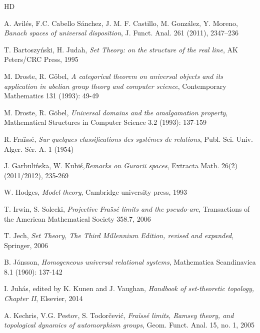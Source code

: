 \documentclass[11pt]{amsart}
\theoremstyle{definition}
\begin{document}
\begin{thebibliography}{HD}
	\baselineskip=15pt
	
	\begin{small}
		

         A. Avil\'es, F.C. Cabello S\'anchez, J. M. F. Castillo, M. Gonz\'alez, Y. Moreno, \textit{Banach spaces of universal disposition}, J. Funct. Anal. 261 (2011), 2347–236
     
	     T. Bartoszy\'nski, H. Judah, \textit{Set Theory: on the structure of the real line}, AK Peters/CRC Press, 1995

         M. Droste, R. G\"obel, \textit{A categorical theorem on universal objects and its application in abelian group theory and computer science}, Contemporary Mathematics 131 (1993): 49-49

         M. Droste, R. G\"obel, \textit{Universal domains and the amalgamation property}, Mathematical Structures in Computer Science 3.2 (1993): 137-159

         R. Fra\"iss\'e, \textit{Sur quelques classifications des syst\'emes de relations}, Publ. Sci. Univ. Alger. S\'er. A. 1 (1954)

         J. Garbuli\'nska, W. Kubi\'s,\textit{Remarks on Gurarii spaces},  Extracta Math. 26(2) (2011/2012), 235-269

         W. Hodges, \textit{Model theory}, Cambridge university press, 1993

         T. Irwin, S. Solecki, \textit{Projective Fra\"ss\'e limits and the pseudo-arc}, Transactions of the American Mathematical Society 358.7, 2006
        
		 T. Jech, \textit{Set Theory, The Third Millennium Edition, revised and expanded}, Springer, 2006

         B. J{\'o}nsson, \textit{Homogeneous universal relational systems}, Mathematica Scandinavica 8.1 (1960): 137-142

          I. Juh\'as, edited by K. Kunen and J. Vaughan, \textit{Handbook of set-theoretic topology, Chapter II}, Elsevier, 2014

         A. Kechris, V.G. Pestov, S. Todor\v{c}evi\'c, \textit{Fra\"iss\'e limits, Ramsey theory, and topological dynamics of automorphism groups}, Geom. Funct. Anal. 15, no. 1, 2005


\end{small}
\end{thebibliography}
\end{document}
